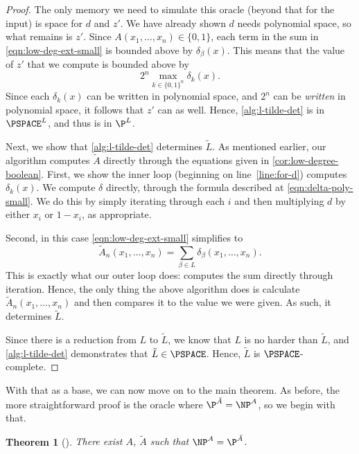 \documentclass[english,12pt]{reedthesis}
\theoremstyle{plain}
\newtheorem{thm}{Theorem}[section]
\theoremstyle{definition}
\theoremstyle{remark}
\begin{document}
\begin{proof}
  The only memory we need to simulate this oracle (beyond that for the input) is
  space for $d$ and $z'$. We have already shown $d$ needs polynomial space, so
  what remains is $z'$. Since $A(x_{1}, \ldots, x_{n}) \in \{0, 1\}$, each term in the
  sum in \cref{eqn:low-deg-ext-small} is bounded above by $\delta_{\beta}(x)$. This means
  that the value of $z'$ that we compute is bounded above by
  \begin{equation}
    2^{n}\max_{k \in \{0, 1\}^{n}}\delta_{k}(x).
  \end{equation}
  Since each $\delta_{k}(x)$ can be written in polynomial space, and $2^{n}$ can be
  \emph{written} in polynomial space, it follows that $z'$ can as well. Hence,
  \cref{alg:l-tilde-det} is in $\PSPACE^{L}$, and thus is in $\P^{L}$.

  Next, we show that \cref{alg:l-tilde-det} determines $\tilde{L}$. As mentioned
  earlier, our algorithm computes $\tilde{A}$ directly through the equations
  given in \cref{cor:low-degree-boolean}. First, we show the inner loop
  (beginning on line~\ref{line:for-d}) computes $\delta_{k}(x)$. We compute $\delta$
  directly, through the formula described at \cref{eqn:delta-poly-small}. We do
  this by simply iterating through each $i$ and then multiplying $d$ by either
  $x_{i}$ or $1-x_{i}$, as appropriate.

  Second, in this case \cref{eqn:low-deg-ext-small} simplifies to
  \begin{equation}
    \tilde{A}_{n}(x_{1}, \ldots, x_{n}) = \sum_{\beta \in L}\delta_{\beta}(x_{1}, \ldots, x_{n}).
  \end{equation}
  This is exactly what our outer loop does: computes the sum directly through
  iteration.
  Hence, the only thing the above algorithm does is calculate
  $\tilde{A}_{n}(x_{1}, \ldots, x_{n})$ and then compares it to the value we were
  given. As such, it determines $\tilde{L}$.

  Since there is a reduction from $L$ to $\tilde{L}$, we know that $L$ is no
  harder than $\tilde{L}$, and \cref{alg:l-tilde-det} demonstrates that
  $\tilde{L} \in \PSPACE$. Hence, $\tilde{L}$ is $\PSPACE$-complete.
\end{proof}

With that as a base, we can now move on to the main theorem. As before, the more
straightforward proof is the oracle where $\P^{\tilde{A}} = \NP^{A}$, so we
begin with that.

\begin{thm}[{\cite[Theorem 5.1]{AW09}}]\label{thm:p-np-alg}
  There exist $A$, $\tilde{A}$ such that $\NP^{A} = \P^{\tilde{A}}$.
\end{thm}
\end{document}
